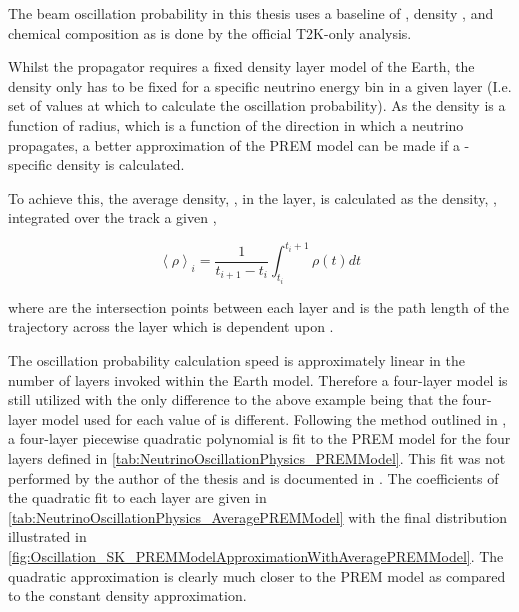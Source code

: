 The beam oscillation probability in this thesis uses a baseline of , density  \cite{Hagiwara2011}, and chemical composition  as is done by the official T2K-only analysis.

Whilst the propagator requires a fixed density layer model of the Earth, the density only has to be fixed for a specific neutrino energy  bin in a given layer (I.e. set of values at which to calculate the oscillation probability). As the density is a function of radius, which is a function of the direction in which a neutrino propagates, a better approximation of the PREM model can be made if a -specific density is calculated. 

To achieve this, the average density, , in the  layer, is calculated as the density, \quickmath{\rho}, integrated over the track a given ,

\begin{equation}
  \left< \rho \right>_{i} = \frac{1}{t_{i+1}-t_{i}} \int^{t_{i}+1}_{t_{i}} \rho(t) dt
\end{equation}

where  are the intersection points between each layer and  is the path length of the trajectory across the layer which is dependent upon .

The oscillation probability calculation speed is approximately linear in the number of layers invoked within the Earth model. Therefore a four-layer model is still utilized with the only difference to the above example being that the four-layer model used for each value of  is different. Following the method outlined in \cite{EarthGrav}, a four-layer piecewise quadratic polynomial is fit to the PREM model for the four layers defined in \autoref{tab:NeutrinoOscillationPhysics_PREMModel}. This fit was not performed by the author of the thesis and is documented in \cite{t2k_tn_425}. The coefficients of the quadratic fit to each layer are given in \autoref{tab:NeutrinoOscillationPhysics_AveragePREMModel} with the final distribution illustrated in \autoref{fig:Oscillation_SK_PREMModelApproximationWithAveragePREMModel}. The quadratic approximation is clearly much closer to the PREM model as compared to the constant density approximation.

